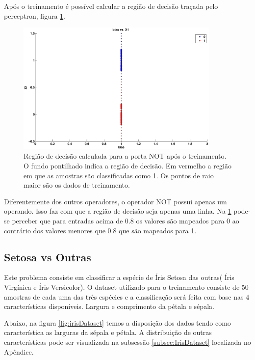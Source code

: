 \documentclass[12pt,journal,onecolumn]{IEEEtran}
\begin{document}
Após o treinamento é possível calcular a região de decisão traçada pelo
perceptron, figura \ref{fig:NotReg}.

\begin{figure}[!htbp]
	\centering
	\includegraphics[width=10cm, trim = 3cm 1cm 3cm 1cm, clip=true]
	{eps/not/NOTRegiao.eps}
	\caption{Região de decisão calculada para a porta NOT após o treinamento. O
	fundo pontilhado indica a região de decisão. Em vermelho a região em que as
	amostras são classificadas como 1. Os pontos de raio maior são os dados de
	treinamento.}
	\label{fig:NotReg}
\end{figure} 

Diferentemente dos outros operadores, o operador NOT possui apenas um operando.
Isso faz com que a região de decisão seja apenas uma linha. Na \ref{fig:NotReg}
pode-se perceber que para entradas acima de 0.8 os valores são mapeados  para 0
ao contrário dos valores menores que 0.8 que são mapeados para 1.

\subsection{Setosa vs Outras}
\label{subsec:setOutras}
Este problema consiste em classificar a espécie de Íris Setosa das outras( Íris
Virgínica e Íris Versicolor). O dataset utilizado para o treinamento consiste de
50 amostras de cada uma das três espécies e a classificação será feita com base
nas 4 características disponíveis. Largura e comprimento da pétala e sépala.

Abaixo, na figura \ref{fig:irisDataset} temos a disposição dos dados tendo como
característica as larguras da sépala e pétala. A distribuição de outras
características pode ser visualizada na subsessão \ref{subsec:IrisDataset}
localizada no Apêndice.
\end{document}
